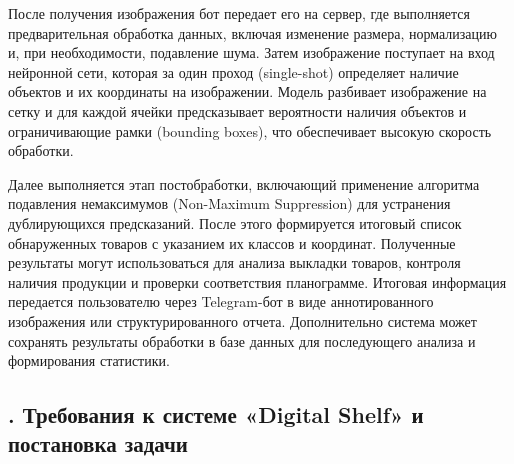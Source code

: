 {  \par \redline После получения изображения бот передает его на сервер, где выполняется
  предварительная обработка данных, включая изменение размера, нормализацию и,
  при необходимости, подавление шума. Затем изображение поступает на вход
  нейронной сети, которая за один проход (single-shot) определяет наличие
  объектов и их координаты на изображении. Модель разбивает изображение на сетку
  и для каждой ячейки предсказывает вероятности наличия объектов и ограничивающие
  рамки (bounding boxes), что обеспечивает высокую скорость обработки.

  Далее выполняется этап постобработки, включающий применение алгоритма
    подавления немаксимумов (Non-Maximum Suppression) для устранения
    дублирующихся предсказаний. После этого формируется итоговый список
    обнаруженных товаров с указанием их классов и координат. Полученные результаты
    могут использоваться для анализа выкладки товаров, контроля наличия продукции
    и проверки соответствия планограмме. Итоговая информация передается
    пользователю через Telegram-бот в виде аннотированного изображения
    или структурированного отчета. Дополнительно система может сохранять
    результаты обработки в базе данных для последующего анализа и формирования
    статистики.


  \par
}

\subtitlespace

\subsection*{
  \gostTitleFont
  \redline
  \thechaptercntr .\thesubchaptercntr \spc
  Требования к системе «Digital Shelf» и постановка задачи
} \addtocounter{subchaptercntr}{1}

\subtitlespace

